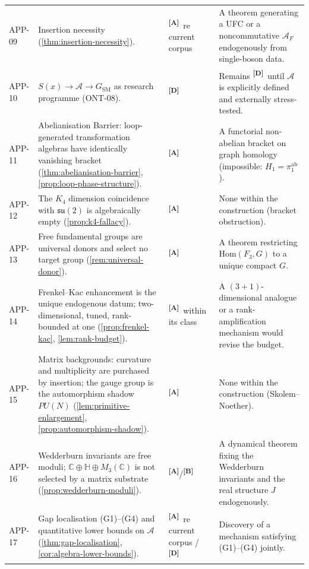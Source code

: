 \documentclass[12pt,a4paper,twoside]{article}
\theoremstyle{plain}
\theoremstyle{definition}
\theoremstyle{remark}
\newcommand{\catmark}[1]{\textsuperscript{\textsf{\textbf{[#1]}}}}
\begin{document}
\begin{longtable}{p{} p{} p{} p{}}
APP-09 & Insertion necessity (\cref{thm:insertion-necessity}). & \catmark{A}\ re current corpus & A theorem generating a UFC or a noncommutative $\mathcal{A}_F$ endogenously from single-boson data. \\
APP-10 & $S(x)\to\mathcal{A}\to G_{\mathrm{SM}}$ as research programme (ONT-08). & \catmark{D} & Remains \catmark{D}\ until $\mathcal{A}$ is explicitly defined and externally stress-tested. \\
APP-11 & Abelianisation Barrier: loop-generated transformation algebras have identically vanishing bracket (\cref{thm:abelianisation-barrier}, \cref{prop:loop-phase-structure}). & \catmark{A} & A functorial non-abelian bracket on graph homology (impossible: $H_1=\pi_1^{\mathrm{ab}}$). \\
APP-12 & The $K_4$ dimension coincidence with $\mathfrak{su}(2)$ is algebraically empty (\cref{prop:k4-fallacy}). & \catmark{A} & None within the construction (bracket obstruction). \\
APP-13 & Free fundamental groups are universal donors and select no target group (\cref{rem:universal-donor}). & \catmark{A} & A theorem restricting $\mathrm{Hom}(F_3,G)$ to a unique compact $G$. \\
APP-14 & Frenkel--Kac enhancement is the unique endogenous datum; two-dimensional, tuned, rank-bounded at one (\cref{prop:frenkel-kac}, \cref{lem:rank-budget}). & \catmark{A}\ within its class & A $(3{+}1)$-dimensional analogue or a rank-amplification mechanism would revise the budget. \\
APP-15 & Matrix backgrounds: curvature and multiplicity are purchased by insertion; the gauge group is the automorphism shadow $PU(N)$ (\cref{lem:primitive-enlargement}, \cref{prop:automorphism-shadow}). & \catmark{A} & None within the construction (Skolem--Noether). \\
APP-16 & Wedderburn invariants are free moduli; $\mathbb{C}\oplus\mathbb{H}\oplus M_3(\mathbb{C})$ is not selected by a matrix substrate (\cref{prop:wedderburn-moduli}). & \catmark{A}/\catmark{B} & A dynamical theorem fixing the Wedderburn invariants and the real structure $J$ endogenously. \\
APP-17 & Gap localisation (G1)--(G4) and quantitative lower bounds on $\mathcal{A}$ (\cref{thm:gap-localisation}, \cref{cor:algebra-lower-bounds}). & \catmark{A}\ re current corpus / \catmark{D} & Discovery of a mechanism satisfying (G1)--(G4) jointly. \\
\bottomrule
\end{longtable}
\newpage
\end{document}
